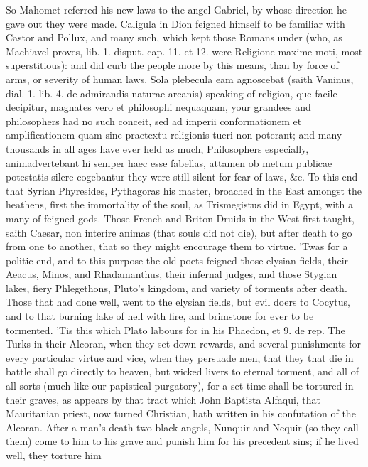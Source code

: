 {So Mahomet referred his new laws to the angel Gabriel, by whose
direction he gave out they were made. Caligula in Dion feigned himself
to be familiar with Castor and Pollux, and many such, which kept those
Romans under (who, as Machiavel proves, lib. 1. disput. cap. 11. et 12.
were Religione maxime moti, most superstitious): and did curb the
people more by this means, than by force of arms, or severity of human
laws. Sola plebecula eam agnoscebat (saith Vaninus, dial. 1. lib. 4. de
admirandis naturae arcanis) speaking of religion, que facile decipitur,
magnates vero et philosophi nequaquam, your grandees and philosophers
had no such conceit, sed ad imperii conformationem et amplificationem
quam sine praetextu religionis tueri non poterant; and many thousands
in all ages have ever held as much, Philosophers especially,
animadvertebant hi semper haec esse fabellas, attamen ob metum publicae
potestatis silere cogebantur they were still silent for fear of laws,
\&c. To this end that Syrian Phyresides, Pythagoras his master, broached
in the East amongst the heathens, first the immortality of the soul, as
Trismegistus did in Egypt, with a many of feigned gods. Those French
and Briton Druids in the West first taught, saith Caesar, non
interire animas (that souls did not die), but after death to go from
one to another, that so they might encourage them to virtue. 'Twas for
a politic end, and to this purpose the old poets feigned those
elysian fields, their Aeacus, Minos, and Rhadamanthus, their infernal
judges, and those Stygian lakes, fiery Phlegethons, Pluto's kingdom,
and variety of torments after death. Those that had done well, went to
the elysian fields, but evil doers to Cocytus, and to that burning lake
of hell with fire, and brimstone for ever to be tormented. 'Tis
this which Plato labours for in his Phaedon, et 9. de rep. The
Turks in their Alcoran, when they set down rewards, and several
punishments for every particular virtue and vice, when they
persuade men, that they that die in battle shall go directly to heaven,
but wicked livers to eternal torment, and all of all sorts (much like
our papistical purgatory), for a set time shall be tortured in their
graves, as appears by that tract which John Baptista Alfaqui, that
Mauritanian priest, now turned Christian, hath written in his
confutation of the Alcoran. After a man's death two black angels,
Nunquir and Nequir (so they call them) come to him to his grave and
punish him for his precedent sins; if he lived well, they torture him
}
